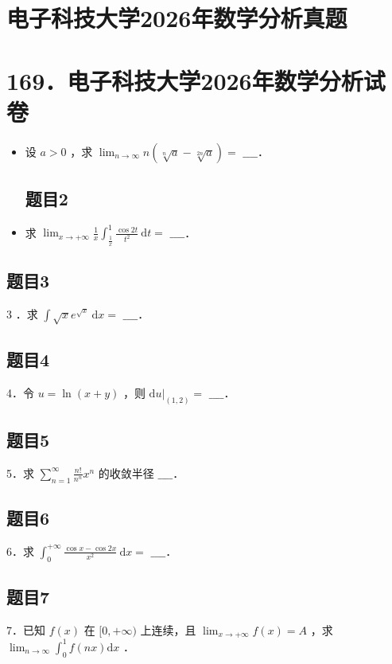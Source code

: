 \documentclass{article}
\begin{document}
\section*{电子科技大学2026年数学分析真题}
\section*{169．电子科技大学2026年数学分析试卷}
\begin{itemize}

\subsection{题目1}
  \item[1．] 设 \(a>0\) ，求 \(\lim _{n \rightarrow \infty} n(\sqrt[n]{a}-\sqrt[2 n]{a})=\) \(\_\_\_\_\)．

\subsection{题目2}
  \item[2．] 求 \(\lim _{x \rightarrow+\infty} \frac{1}{x} \int_{\frac{1}{x}}^{1} \frac{\cos 2 t}{t^{2}} \mathrm{~d} t=\) \(\_\_\_\_\)．
\end{itemize}

\subsection{题目3}
3 ．求 \(\int \sqrt{x} e^{\sqrt{x}} \mathrm{~d} x=\) \(\_\_\_\_\)．

\subsection{题目4}
4．令 \(u=\ln (x+y)\) ，则 \(\left.\mathrm{d} u\right|_{(1,2)}=\) \(\_\_\_\_\)．

\subsection{题目5}
5．求 \(\sum_{n=1}^{\infty} \frac{n!}{n^{n}} x^{n}\) 的收敛半径 \(\_\_\_\_\)．

\subsection{题目6}
6．求 \(\int_{0}^{+\infty} \frac{\cos x-\cos 2 x}{x^{2}} \mathrm{~d} x=\) \(\_\_\_\_\)．

\subsection{题目7}
7．已知 \(f(x)\) 在 \([0,+\infty)\) 上连续，且 \(\lim _{x \rightarrow+\infty} f(x)=A\) ，求 \(\lim _{n \rightarrow \infty} \int_{0}^{1} f(n x) \mathrm{d} x\) ．
\end{document}
